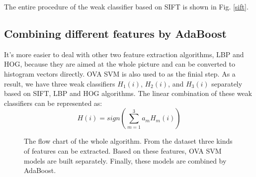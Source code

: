 \documentclass[conference]{IEEEtran}
\begin{document}
The entire procedure of the weak classifier based on SIFT is shown in Fig. \ref{sift}. 

\subsection{Combining different features by AdaBoost}
It's more easier to deal with other two feature extraction algorithms, LBP and HOG, because they are aimed at the whole picture and can be converted to histogram vectors directly. OVA SVM is also used to as the finial step. As a result, we have three weak classifiers $H_1(i)$, $H_2(i)$, and $H_3(i)$ separately based on SIFT, LBP and HOG algorithms. The linear combination of these weak classifiers can be represented as:
\begin{equation}
	H(i) = sign(\sum\limits_{m=1}^{3}a_mH_m(i))
\end{equation}
\begin{figure}[H]
				\centering
				\caption{ The flow chart of the whole algorithm. From the dataset three kinds of features can be extracted. Based on these features, OVA SVM models are built separately. Finally, these models are combined by AdaBoost. }\label{all}
			\end{figure}
\end{document}
